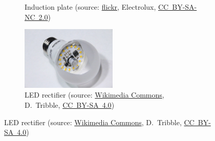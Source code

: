 \begin{frame}[c]
\begin{figure}
\begin{subfigure}[b]{0.49\textwidth}
			\caption{Induction plate (source: \href{https://www.flickr.com/photos/electrolux-design-lab/6035618944}{flickr}, Electrolux, \href{https://creativecommons.org/licenses/by-nc/2.0/}{CC~BY-SA-NC~2.0})}
		\end{subfigure}
		\pause
		\hfill
		\begin{subfigure}[b]{0.49\textwidth}
			\centering
			\includegraphics[width=0.5\textwidth]{fig/lec01/LED_light_bulb.jpg}
			\caption{LED rectifier (source: \href{https://commons.wikimedia.org/wiki/File:LED-E27-Light-Bulb-1134.jpg}{Wikimedia Commons}, D.~Tribble, \href{https://creativecommons.org/licenses/by-sa/4.0/deed.en}{CC~BY-SA~4.0})}
		\end{subfigure}
	\end{figure}
\end{frame}

